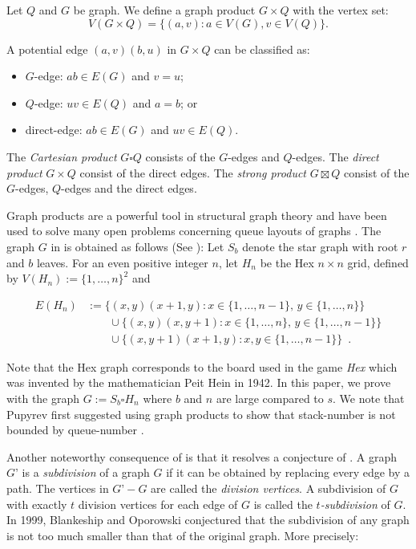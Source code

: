\documentclass[kpfonts]{patmorin}
\begin{document}
Let $Q$ and $G$ be graph. We define a graph product $G \times Q$ with the vertex set:
$$V(G \times Q)= \{(a,v): a \in V(G), v \in V(Q)\}.$$

A potential edge $(a,v)(b,u)$ in $G \times Q$ can be classified as:
\begin{itemize}
	\item $G$-edge: $ab \in E(G)$ and $v=u$;
	\item $Q$-edge: $uv \in E(Q)$ and $a=b$; or
	\item direct-edge: $ab \in E(G)$ and $uv \in E(Q)$.
\end{itemize}

The \textit{Cartesian product} $G \square Q$ consists of the $G$-edges and $Q$-edges. The \textit{direct product} $G \times Q$ consist of the direct edges. The \textit{strong product} $G \boxtimes Q$ consist of the $G$-edges, $Q$-edges and the direct edges.

Graph products are a powerful tool in structural graph theory and have been used to solve many open problems concerning queue layouts of graphs \cite{DJMMUW20,DMW}. The graph $G$ in  is obtained as follows (See ): Let $S_b$ denote the star graph with root $r$ and $b$ leaves. For an even positive integer $n$, let $H_n$ be the Hex $n \times n$ grid, defined by $V(H_n):=\{1,\ldots,n\}^2$ and

\begin{align*}
E(H_n) & :=\{(x,y)(x+1,y):x\in\{1,\ldots,n-1\},\,y\in\{1,\ldots,n\}\} \\
& \qquad \cup \{(x,y)(x,y+1):x\in\{1,\ldots,n\},\,y\in\{1,\ldots,n-1\}\} \\
& \qquad \cup \{(x,y+1)(x+1,y):x,y\in\{1,\ldots,n-1\}\} \enspace .
\end{align*}

Note that the Hex graph corresponds to the board used in the game \textit{Hex} which was invented by the mathematician Peit Hein in 1942. In this paper, we prove  with the graph $G:= S_b \square H_n$ where $b$ and $n$ are large compared to $s$. We note that Pupyrev first suggested using graph products to show that stack-number is not bounded by queue-number \cite{Pupyrev20}.

Another noteworthy consequence of  is that it resolves a conjecture of \citet{BO99,BO01}. A graph $G’$ is a \textit{subdivision} of a graph $G$ if it can be obtained by replacing every edge by a path. The vertices in $G’-G$ are called the \textit{division vertices}. A subdivision of $G$ with exactly $t$ division vertices for each edge of $G$ is called the \textit{$t$-subdivision} of $G$. In 1999, Blankeship and Oporowski conjectured that the subdivision of any graph is not too much smaller than that of the original graph. More precisely:
\end{document}
